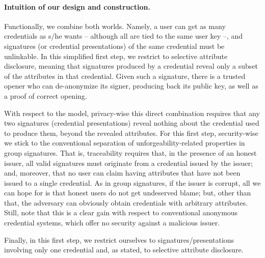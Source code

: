 \paragraph{Intuition of our design and construction.} %
Functionally, we combine both worlds. Namely, a user can get as many credentials
as s/he wants -- although all are tied to the same user key --, and signatures
(or credential presentations) of the same credential must be unlinkable. In this
simplified first step, we restrict to selective attribute disclosure, meaning
that signatures produced by a credential reveal only a subset of the attributes
in that credential. Given such a signature, there is a trusted opener who can
de-anonymize its signer, producing back its public key, as well as a proof of
correct opening.

With respect to the model, privacy-wise this direct combination requires that
any two signatures (credential presentations) reveal nothing about the
credential used to produce them, beyond the revealed attributes. For this first
step, security-wise we stick to the conventional separation of
unforgeability-related properties in group signatures. That is, traceability
requires that, in the presence of an honest issuer, all valid signatures must
originate from a credential issued by the issuer; and, moreover, that no
user can claim having attributes that have not been issued to a single
credential. As in group signatures, if the issuer is corrupt, all we can hope
for is that honest users do not get undeserved blame; but, other than that,
the adversary can obviously obtain credentials with arbitrary attributes. Still,
note that this is a clear gain with respect to conventional anonymous credential
systems, which offer no security against a malicious issuer.

Finally, in this first step, we restrict ourselves to signatures/presentations
involving only one credential and, as stated, to selective attribute disclosure.





